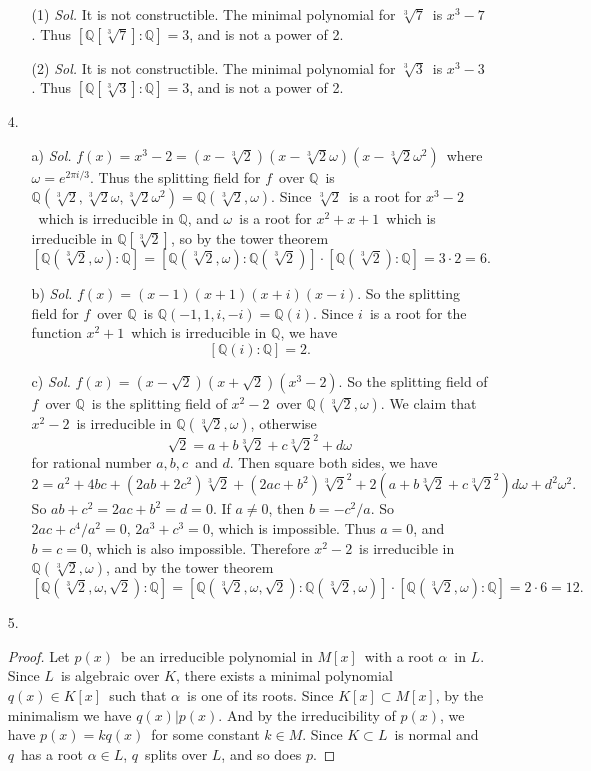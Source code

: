 \documentclass[12pt]{article}
\newcommand{\Q}{\mathbb{Q}}
\begin{document}
\begin{enumerate}
\begin{enumerate}
		\item[(1)]
		\textit{Sol.}
			\quad It is not constructible. The minimal polynomial for $\sqrt[3]{7}$\ is $x^3-7$. Thus $[\Q[\sqrt[3]{7}]:\Q]=3$, and is not a power of 2.
		\item[(2)]
		\textit{Sol.}
			\quad It is not constructible. The minimal polynomial for $\sqrt[3]{3}$\ is $x^3-3$. Thus $[\Q[\sqrt[3]{3}]:\Q]=3$, and is not a power of 2.
	\end{enumerate}
	\item[4.]
	\begin{enumerate}
		\item[a)]
		\textit{Sol.}
			\quad $f(x)=x^3-2=(x-\sqrt[3]{2})(x-\sqrt[3]{2}\omega)(x-\sqrt[3]{2}\omega^2)$\ where $\omega=e^{2\pi i/3}$. Thus the splitting field for $f$\ over $\Q$\ is $\Q(\sqrt[3]{2},\sqrt[3]{2}\omega,\sqrt[3]{2}\omega^2)=\Q(\sqrt[3]{2},\omega)$. Since $\sqrt[3]{2}$\ is a root for $x^3-2$\ which is irreducible in $\Q$, and $\omega$\ is a root for $x^2+x+1$\ which is irreducible in $\Q[\sqrt[3]{2}]$, so by the tower theorem
			$$[\Q(\sqrt[3]{2},\omega):\Q]=[\Q(\sqrt[3]{2},\omega):\Q(\sqrt[3]{2})]\cdot[\Q(\sqrt[3]{2}):\Q]=3\cdot2=6.$$
		\item[b)]
		\textit{Sol.}
			\quad $f(x)=(x-1)(x+1)(x+i)(x-i)$. So the splitting field for $f$\ over $\Q$\ is $\Q(-1,1,i,-i)=\Q(i)$. Since $i$\ is a root for the function $x^2+1$\ which is irreducible in $\Q$, we have
			$$[\Q(i):\Q]=2.$$
		\item[c)]
		\textit{Sol.}
			$f(x)=(x-\sqrt{2})(x+\sqrt{2})(x^3-2)$. So the splitting field of $f$\ over $\Q$\ is the splitting field of $x^2-2$\ over $\Q(\sqrt[3]{2},\omega)$. We claim that $x^2-2$\ is irreducible in $\Q(\sqrt[3]{2},\omega)$, otherwise
			$$\sqrt{2}=a+b\sqrt[3]{2}+c\sqrt[3]{2}^2+d\omega$$
			for rational number $a,b,c$\ and $d$. Then square both sides, we have
			$$2=a^2+4bc+(2ab+2c^2)\sqrt[3]{2}+(2ac+b^2)\sqrt[3]{2}^2+2(a+b\sqrt[3]{2}+c\sqrt[3]{2}^2)d\omega+d^2\omega^2.$$
			So $ab+c^2=2ac+b^2=d=0$. If $a\neq0$, then $b=-c^2/a$. So $2ac+c^4/a^2=0$, $2a^3+c^3=0$, which is impossible. Thus $a=0$, and $b=c=0$, which is also impossible. Therefore $x^2-2$\ is irreducible in $\Q(\sqrt[3]{2},\omega)$, and by the tower theorem
			$$[\Q(\sqrt[3]{2},\omega,\sqrt{2}):\Q]=[\Q(\sqrt[3]{2},\omega,\sqrt{2}):\Q(\sqrt[3]{2},\omega)]\cdot[\Q(\sqrt[3]{2},\omega):\Q]=2\cdot6=12.$$
	\end{enumerate}
	\item[5.]
	\begin{proof}
		\quad Let $p(x)$\ be an irreducible polynomial in $M[x]$\ with a root $\alpha$\ in $L$. Since $L$\ is algebraic over $K$, there exists a minimal polynomial $q(x)\in K[x]$\ such that $\alpha$\ is one of its roots. Since $K[x]\subset M[x]$, by the minimalism we have $q(x)|p(x)$. And by the irreducibility of $p(x)$, we have $p(x)=kq(x)$\ for some constant $k\in M$. Since $K\subset L$\ is normal and $q$\ has a root $\alpha\in L$, $q$\ splits over $L$, and so does $p$.

\end{proof}
\end{enumerate}
\end{document}
